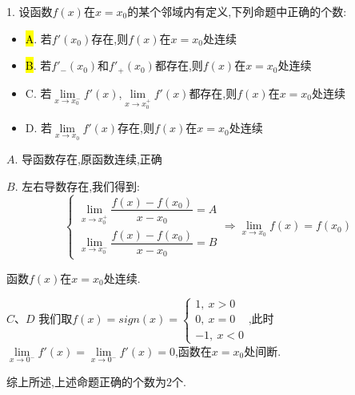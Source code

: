 1. 设函数$f(x)$在$x=x_{0}$的某个邻域内有定义,下列命题中正确的个数:  
\begin{itemize}
	\item \hl{A}. 若$f'(x_{0})$存在,则$f(x)$在$x=x_{0}$处连续
	\item \hl{B}. 若$f'_{-}(x_{0})$和$f'_{+}(x_{0})$都存在,则$f(x)$在$x=x_{0}$处连续
	\item C. 若$\lim\limits_{x\rightarrow x_{0}^{-}}f'(x)$,$\lim\limits_{x\rightarrow x_{0}^{+}}f'(x)$都存在,则$f(x)$在$x=x_{0}$处连续
	\item D. 若$\lim\limits_{x\rightarrow x_{0}}f'(x)$存在,则$f(x)$在$x=x_{0}$处连续
\end{itemize}
\begin{solution}

	$A$. 导函数存在,原函数连续,正确
	
	$B$. 左右导数存在,我们得到:  
	$$\left\lbrace
	\begin{array}{l}
		\lim\limits_{x\rightarrow x_{0}^{+}}\dfrac{f(x)-f(x_{0})}{x-x_{0}}=A\\
		\lim\limits_{x\rightarrow x_{0}^{-}}\dfrac{f(x)-f(x_{0})}{x-x_{0}}=B
	\end{array}
	\right. \Rightarrow \lim\limits_{x\rightarrow x_{0}}f(x)=f(x_{0})$$
	
	函数$f(x)$在$x=x_{0}$处连续.
	
	$C\text{、}D$ 我们取$f(x)=sign(x)=\left\lbrace
	\begin{array}{l}
		1,\ x>0\\
		0,\ x=0\\
		-1,\ x<0
	\end{array}
	\right. $,此时$\lim\limits_{x\rightarrow 0^{-}}f'(x)=\lim\limits_{x\rightarrow 0^{-}}f'(x)=0$,函数在$x=x_{0}$处间断.
	
	综上所述,上述命题正确的个数为$2$个.
\end{solution}

